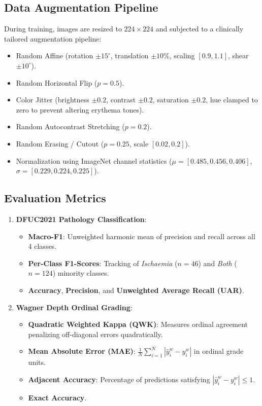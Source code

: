 \documentclass[journal]{IEEEtran}
\begin{document}
\subsection{Data Augmentation Pipeline}
During training, images are resized to $224 \times 224$ and subjected to a clinically tailored augmentation pipeline:
\begin{itemize}
    \item Random Affine (rotation $\pm 15^\circ$, translation $\pm 10\%$, scaling $[0.9, 1.1]$, shear $\pm 10^\circ$).
    \item Random Horizontal Flip ($p = 0.5$).
    \item Color Jitter (brightness $\pm 0.2$, contrast $\pm 0.2$, saturation $\pm 0.2$, hue clamped to zero to prevent altering erythema tones).
    \item Random Autocontrast Stretching ($p = 0.2$).
    \item Random Erasing / Cutout ($p = 0.25$, scale $[0.02, 0.2]$).
    \item Normalization using ImageNet channel statistics ($\mu = [0.485, 0.456, 0.406]$, $\sigma = [0.229, 0.224, 0.225]$).
\end{itemize}

\subsection{Evaluation Metrics}
\begin{enumerate}
    \item \textbf{DFUC2021 Pathology Classification}:
    \begin{itemize}
        \item \textbf{Macro-F1}: Unweighted harmonic mean of precision and recall across all 4 classes.
        \item \textbf{Per-Class F1-Scores}: Tracking of \textit{Ischaemia} ($n = 46$) and \textit{Both} ($n = 124$) minority classes.
        \item \textbf{Accuracy}, \textbf{Precision}, and \textbf{Unweighted Average Recall (UAR)}.
    \end{itemize}
    \item \textbf{Wagner Depth Ordinal Grading}:
    \begin{itemize}
        \item \textbf{Quadratic Weighted Kappa (QWK)}: Measures ordinal agreement penalizing off-diagonal errors quadratically.
        \item \textbf{Mean Absolute Error (MAE)}: $\frac{1}{N} \sum_{i=1}^N |\hat{y}_i^w - y_i^w|$ in ordinal grade units.
        \item \textbf{Adjacent Accuracy}: Percentage of predictions satisfying $|\hat{y}_i^w - y_i^w| \le 1$.
        \item \textbf{Exact Accuracy}.
    \end{itemize}
\end{enumerate}
\end{document}
